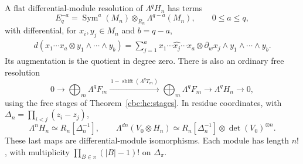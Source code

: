 \begin{proposition}
\label{cbc:ct:exterior-resolutions}
A flat differential-module resolution of $\Lambda^qH_n$ has
terms
\[
 E_q^{-a}=\operatorname{Sym}^a(M_n)\otimes_{R_n}
                     \Lambda^{q-a}(M_n),\qquad 0\leq a\leq q,
\]
with differential, for $x_i,y_j\in M_n$ and $b=q-a$,
\begin{align*}
 d(x_1\cdots x_a\otimes y_1\wedge\cdots\wedge y_b)
   =\sum_{j=1}^a x_1\cdots\widehat{x_j}\cdots x_a
       \otimes\partial_wx_j\wedge y_1\wedge\cdots\wedge y_b.
\end{align*}
Its augmentation is the quotient in degree zero. There is also
an ordinary free resolution
\begin{equation}\label{cbc:ct:exterior-telescope}
 0\longrightarrow\bigoplus_m\Lambda^qF_m
 \xrightarrow{\,1-\operatorname{shift}(\Lambda^qT_m)\,}
 \bigoplus_m\Lambda^qF_m\longrightarrow\Lambda^qH_n
 \longrightarrow0,
\end{equation}
using the free stages of Theorem~\ref{cbc:hc:stages}.
In residue coordinates, with
$\Delta_n=\prod_{i<j}(z_i-z_j)$,
\begin{equation}\label{cbc:ct:determinant}
 \Lambda^nH_n\simeq R_n[\Delta_n^{-1}],\qquad
 \Lambda^{dn}(V_0\otimes H_n)
    \simeq R_n[\Delta_n^{-1}]\otimes\det(V_0)^{\otimes n}.
\end{equation}
These last maps are differential-module isomorphisms. Each
module has length $n!$, with multiplicity
$\prod_{B\in\pi}(|B|-1)!$ on $\Delta_\pi$.
\end{proposition}

